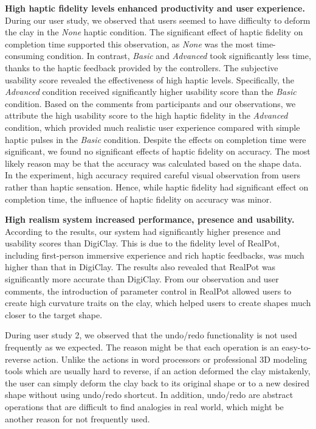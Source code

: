 \documentclass{svjour3}                     %
\begin{document}
{\textbf{High haptic fidelity levels enhanced productivity and user experience. }
During our user study, we observed that users seemed to have difficulty to deform the clay in the \textit{None} haptic condition.
The significant effect of haptic fidelity on completion time supported this observation, as \textit{None} was the most time-consuming condition.
In contrast, \textit{Basic} and \textit{Advanced} took significantly less time, thanks to the haptic feedback provided by the controllers.
%
The subjective usability score revealed the effectiveness of high haptic levels.
Specifically, the \textit{Advanced} condition received significantly higher usability score than the \textit{Basic} condition.
Based on the comments from participants and our observations, we attribute the high usability score to the high haptic fidelity in the \textit{Advanced} condition, which provided much realistic user experience compared with simple haptic pulses in the \textit{Basic} condition.
%
Despite the effects on completion time were significant, we found no significant effects of haptic fidelity on accuracy.
The most likely reason may be that the accuracy was calculated based on the shape data.
In the experiment, high accuracy required careful visual observation from users rather than haptic sensation.
Hence, while haptic fidelity had significant effect on completion time, the influence of haptic fidelity on accuracy was minor.

\textbf{High realism system increased performance, presence and usability. }
According to the results, our system had significantly higher presence and usability scores than DigiClay.
This is due to the fidelity level of RealPot, including first-person immersive experience and rich haptic feedbacks, was much higher than that in DigiClay.
%
The results also revealed that RealPot was significantly more accurate than DigiClay. 
From our observation and user comments, the introduction of parameter control in RealPot allowed users to create high curvature traits on the clay, which helped users to create shapes much closer to the target shape.

During user study 2, we observed that the undo/redo functionality is not used frequently as we expected.
The reason might be that each operation is an easy-to-reverse action. Unlike the actions in word processors or professional 3D modeling tools which are usually hard to reverse, if an action deformed the clay mistakenly, the user can simply deform the clay back to its original shape or to a new desired shape without using undo/redo shortcut.
In addition, undo/redo are abstract operations that are difficult to find analogies in real world, which might be another reason for not frequently used.

}
\end{document}
